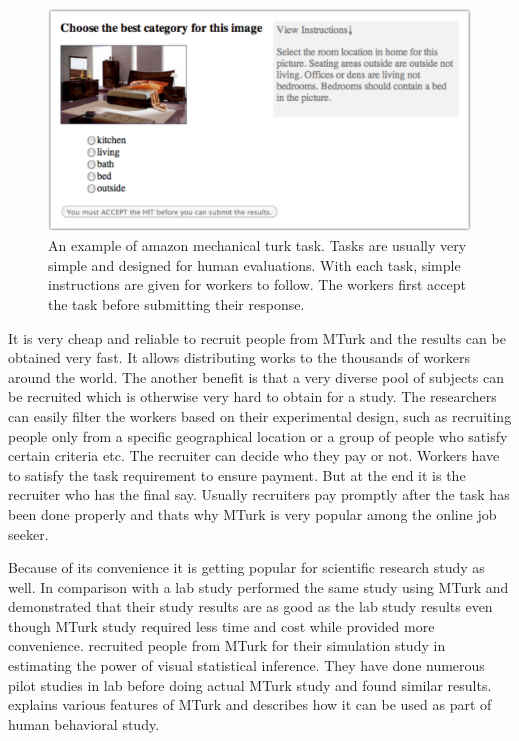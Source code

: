 \documentclass[11pt]{article}
\begin{document}
\begin{figure}[htbp] 
   \centering
   \includegraphics[width=5in]{amazon_task.pdf} 
   \caption{An example of amazon mechanical turk task. Tasks are usually very simple and designed for human evaluations. With each task, simple instructions are given for workers to follow. The workers first accept the task before submitting their response.}
   \label{fig:amazon_task}
\end{figure}

It is very cheap and reliable to recruit people from MTurk and the results can be obtained very fast. It allows distributing works to the thousands of workers around the world. The another benefit is that a very diverse pool of subjects can be recruited which is otherwise very hard to obtain for a study. The researchers can easily filter the workers based on their experimental design, such as recruiting people only from a specific geographical location or a group of people who satisfy certain criteria etc. The recruiter can decide who they pay or not. Workers have to satisfy the task requirement to ensure payment. But at the end it is the recruiter who has the final say. Usually recruiters pay promptly after the task has been done properly and thats why MTurk is very popular among the online job seeker.  


Because of its convenience it is getting popular for scientific research study as well. In comparison with a lab study \cite{suri:2010} performed the same study using MTurk and demonstrated that their study results are as good as the lab study results even though MTurk study required less time and cost while provided more convenience. \cite{majumder:2013} recruited people from MTurk for their simulation study in estimating the power of visual statistical inference. They have done numerous pilot studies in lab before doing actual MTurk study and found similar results. \cite{mason:2012} explains various features of MTurk and describes how it can be used as part of human behavioral study.
\end{document}
